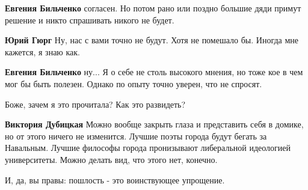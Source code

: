 \begin{itemize}
\begin{itemize}
\textbf{Евгения Бильченко} согласен. Но потом рано или поздно большие дяди примут решение и никто спрашивать никого не будет.

 
\textbf{Юрий Гюрг} Ну, нас с вами точно не будут. Хотя не помешало бы. Иногда мне кажется, я знаю как.

 
\textbf{Евгения Бильченко} ну... Я о себе не столь высокого мнения, но тоже кое
в чем мог бы быть полезен. Однако по опыту точно уверен, что не спросят.

\end{itemize}

 
Боже, зачем я это прочитала? Как это развидеть?

\begin{itemize}
 
\textbf{Виктория Дубицкая} Можно вообще закрыть глаза и представить себя в
домике, но от этого ничего не изменится. Лучшие поэты города будут бегать за
Навальным. Лучшие философы города пронизывают либеральной идеологией
университеты. Можно делать вид, что этого нет, конечно.

 
И, да, вы правы: пошлость - это воинствующее упрощение.


\end{itemize}
\end{itemize}
